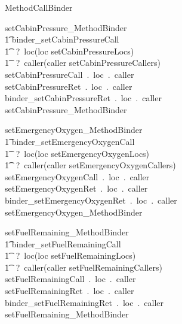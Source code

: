 

\begin{circus}
\circprocess  MethodCallBinder \circdef \circbegin \\
\end{circus}
%
%
\begin{circusaction}
setCabinPressure\_MethodBinder \circdef \\
	\t1 \circblockopen
	binder\_setCabinPressureCall\\ \t1 ~?~loc\prefixcolon(loc \in setCabinPressureLocs)\\ \t1 ~?~caller\prefixcolon(caller \in setCabinPressureCallers)  \cross {}  \then \\
	setCabinPressureCall~.~loc~.~caller  \cross {}  \then \\
	setCabinPressureRet~.~loc~.~caller \then \\
	binder\_setCabinPressureRet~.~loc~.~caller  \then \\
	setCabinPressure\_MethodBinder
	\circblockclose
\end{circusaction}
%
%
\begin{circusaction}
setEmergencyOxygen\_MethodBinder \circdef \\
	\t1 \circblockopen
	binder\_setEmergencyOxygenCall\\ \t1 ~?~loc\prefixcolon(loc \in setEmergencyOxygenLocs)\\ \t1 ~?~caller\prefixcolon(caller \in setEmergencyOxygenCallers)  \cross {}  \then \\
	setEmergencyOxygenCall~.~loc~.~caller  \cross {}  \then \\
	setEmergencyOxygenRet~.~loc~.~caller \then \\
	binder\_setEmergencyOxygenRet~.~loc~.~caller  \then \\
	setEmergencyOxygen\_MethodBinder
	\circblockclose
\end{circusaction}
%
%
\begin{circusaction}
setFuelRemaining\_MethodBinder \circdef \\
	\t1 \circblockopen
	binder\_setFuelRemainingCall\\ \t1 ~?~loc\prefixcolon(loc \in setFuelRemainingLocs)\\ \t1 ~?~caller\prefixcolon(caller \in setFuelRemainingCallers)  \cross {}  \then \\
	setFuelRemainingCall~.~loc~.~caller  \cross {}  \then \\
	setFuelRemainingRet~.~loc~.~caller \then \\
	binder\_setFuelRemainingRet~.~loc~.~caller  \then \\
	setFuelRemaining\_MethodBinder
	\circblockclose
\end{circusaction}
